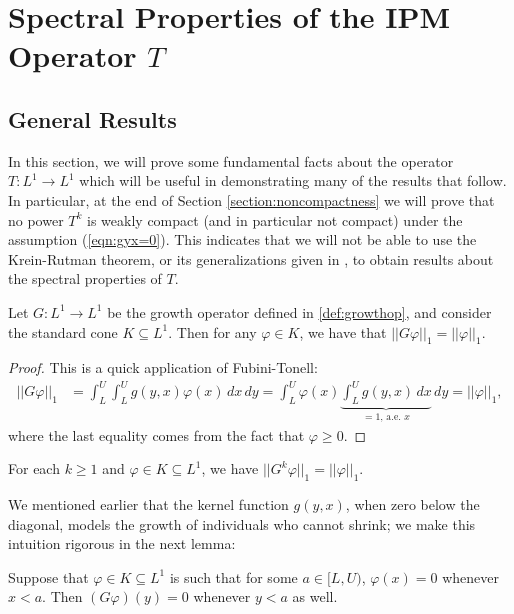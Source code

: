 \chapter{Spectral Properties of the IPM Operator $T$}

\section{General Results} \label{section:general}

In this section, we will prove some fundamental facts about the operator $T:L^1 \to L^1$ which will be useful in demonstrating many of the results that follow. In particular, at the end of Section \ref{section:noncompactness} we will prove that no power $T^k$ is weakly compact (and in particular not compact) under the assumption (\ref{eqn:gyx=0}). This indicates that we will not be able to use the Krein-Rutman theorem, or its generalizations given in \cite{Kras1989}, to obtain results about the spectral properties of $T$.

\begin{lemma} \label{th:norm=1}
	Let $G:L^1 \to L^1$ be the growth operator defined in \eqref{def:growthop}, and consider the standard cone $K \subseteq L^1$. Then for any $\varphi \in K$, we have that $||G \varphi||_1 = ||\varphi||_1$.
\end{lemma}

\begin{proof}
	This is a quick application of Fubini-Tonell:
	\begin{align*}
		||G\varphi||_1 &= \int_L^U \int_L^U g(y,x) \varphi(x) \, dx \, dy = \int_L^U \varphi(x) \underbrace{\int_L^U g(y,x) \, dx}_{=1, \, \text{a.e. } x} \, dy = ||\varphi||_1,
	\end{align*}
	where the last equality comes from the fact that $\varphi \geq 0$.
\end{proof}

\begin{corollary} \label{th:corollarytonorm=1}
	For each $k \geq 1$ and $\varphi \in K \subseteq L^1$, we have $||G^k \varphi||_1 = ||\varphi||_1$.
\end{corollary}

We mentioned earlier that the kernel function $g(y,x)$, when zero below the diagonal, models the growth of individuals who cannot shrink; we make this intuition rigorous in the next lemma:

\begin{lemma} \label{th:giszero}
	Suppose that $\varphi \in K \subseteq L^1$ is such that for some $a \in [L,U)$, $\varphi(x) = 0$ whenever $x < a$. Then $(G\varphi)(y) =0$ whenever $y < a$ as well.
\end{lemma}

